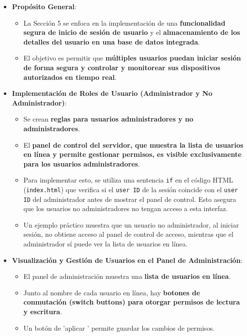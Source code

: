 \documentclass{report}
\begin{document}
\begin{itemize}
    \item \textbf{Propósito General}:
    \begin{itemize}
        \item La Sección 5 se enfoca en la implementación de una \textbf{funcionalidad segura de inicio de sesión de usuario} y el \textbf{almacenamiento 
        de los detalles del usuario en una base de datos integrada}.
        \item El objetivo es permitir que \textbf{múltiples usuarios puedan iniciar sesión de forma segura y controlar y monitorear sus dispositivos 
        autorizados en tiempo real}.
    \end{itemize}
    \item \textbf{Implementación de Roles de Usuario (Administrador y No Administrador)}:
    \begin{itemize}
        \item Se crean \textbf{reglas para usuarios administradores y no administradores}.
        \item El \textbf{panel de control del servidor, que muestra la lista de usuarios en línea y permite gestionar permisos, es visible exclusivamente para 
        los usuarios administradores}.
        \item Para implementar esto, se utiliza una sentencia \texttt{if} en el código HTML (\verb|index.html|) que verifica si el \texttt{user ID} de la 
        sesión coincide con el \texttt{user ID} del administrador antes de mostrar el panel de control. Esto asegura que los usuarios no administradores no 
        tengan acceso a esta interfaz.
        \item Un ejemplo práctico muestra que un usuario no administrador, al iniciar sesión, no obtiene acceso al panel de control de acceso, mientras 
        que el administrador sí puede ver la lista de usuarios en línea.
    \end{itemize}
    \item \textbf{Visualización y Gestión de Usuarios en el Panel de Administración}:
    \begin{itemize}
        \item El panel de administración muestra una \textbf{lista de usuarios en línea}.
        \item Junto al nombre de cada usuario en línea, hay \textbf{botones de conmutación (switch buttons) para otorgar permisos de lectura y escritura}.
        \item Un botón de  'aplicar ' permite guardar los cambios de permisos.

\end{itemize}
\end{itemize}
\end{document}
